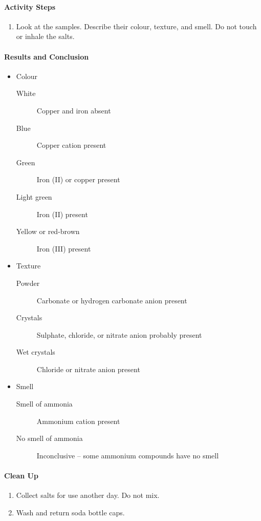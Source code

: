 \paragraph{Activity Steps}
\begin{enumerate}
\item{Look at the samples. Describe their colour, texture, and smell. Do not touch or inhale the salts.}
\end{enumerate}

\paragraph{Results and Conclusion}
\begin{itemize}
\item{Colour}
\begin{description}
\item[White]{Copper and iron absent}
\item[Blue]{Copper cation present}
\item[Green]{Iron (II) or copper present}
\item[Light green]{Iron (II) present}
\item[Yellow or red-brown]{Iron (III) present}
\end{description}
\item{Texture}
\begin{description}
\item[Powder]{Carbonate or hydrogen carbonate anion present}
\item[Crystals]{Sulphate, chloride, or nitrate anion probably present}
\item[Wet crystals]{Chloride or nitrate anion present}
\end{description}
\item{Smell}
\begin{description}
\item[Smell of ammonia]{Ammonium cation present}
\item[No smell of ammonia]{Inconclusive -- some ammonium compounds have no smell}
\end{description}
\end{itemize}

\paragraph{Clean Up}
\begin{enumerate}
\item{Collect salts for use another day. Do not mix.}
\item{Wash and return soda bottle caps.}
\end{enumerate}

